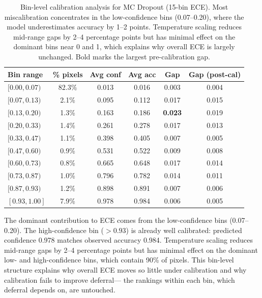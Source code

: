 \begin{table}[H]
\centering
\caption{Bin-level calibration analysis for MC Dropout (15-bin ECE). Most
miscalibration concentrates in the low-confidence bins (0.07--0.20), where
the model underestimates accuracy by 1--2 points. Temperature scaling
reduces mid-range gaps by 2--4 percentage points but has minimal effect
on the dominant bins near 0 and 1, which explains why overall ECE is
largely unchanged. Bold marks the largest pre-calibration gap.}
\label{tab:bins}
\scriptsize
\setlength{\tabcolsep}{3.5pt}
\renewcommand{\arraystretch}{1.03}
\begin{center}
\begin{tabular}{l c c c c c}
\toprule
\textbf{Bin range} & \textbf{\% pixels} & \textbf{Avg conf} &
\textbf{Avg acc} & \textbf{Gap} & \textbf{Gap (post-cal)} \\
\midrule
$[0.00, 0.07)$  & 82.3\% & 0.013 & 0.016 & 0.003 & 0.004 \\
$[0.07, 0.13)$  &  2.1\% & 0.095 & 0.112 & 0.017 & 0.015 \\
$[0.13, 0.20)$  &  1.3\% & 0.163 & 0.186 & \textbf{0.023} & 0.019 \\
$[0.20, 0.33)$  &  1.4\% & 0.261 & 0.278 & 0.017 & 0.013 \\
$[0.33, 0.47)$  &  1.1\% & 0.398 & 0.405 & 0.007 & 0.005 \\
$[0.47, 0.60)$  &  0.9\% & 0.531 & 0.522 & 0.009 & 0.008 \\
$[0.60, 0.73)$  &  0.8\% & 0.665 & 0.648 & 0.017 & 0.014 \\
$[0.73, 0.87)$  &  1.0\% & 0.796 & 0.782 & 0.014 & 0.011 \\
$[0.87, 0.93)$  &  1.2\% & 0.898 & 0.891 & 0.007 & 0.006 \\
$[0.93, 1.00]$  &  7.9\% & 0.978 & 0.984 & 0.006 & 0.005 \\
\bottomrule
\end{tabular}
\end{center}
\end{table}

The dominant contribution to ECE comes from the low-confidence bins
(0.07--0.20). The high-confidence bin ($>0.93$) is already well calibrated:
predicted confidence 0.978 matches observed accuracy 0.984. Temperature
scaling reduces mid-range gaps by 2--4 percentage points but has minimal
effect on the dominant low- and high-confidence bins, which contain 90\%
of pixels. This bin-level structure explains why overall ECE moves so
little under calibration and why calibration fails to improve deferral---
the rankings within each bin, which deferral depends on, are untouched.

